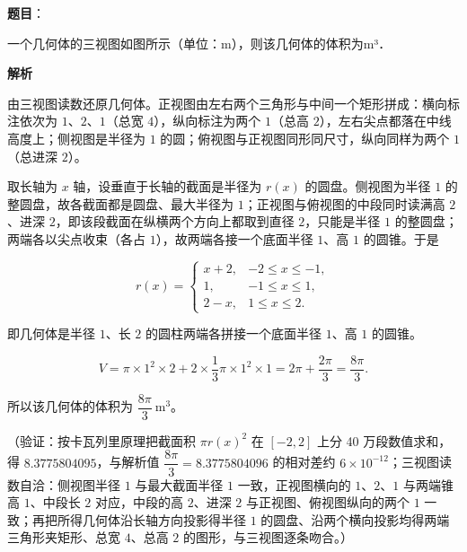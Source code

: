 \begin{answer}

\textbf{题目}：

一个几何体的三视图如图所示（单位：m），则该几何体的体积为\gkblank{}m³．
\nopagebreak[4]
\begin{center}\end{center}
\nopagebreak[4]
\textbf{解析}

由三视图读数还原几何体。正视图由左右两个三角形与中间一个矩形拼成：横向标注依次为 \(1\)、\(2\)、\(1\)（总宽 \(4\)），纵向标注为两个 \(1\)（总高 \(2\)），左右尖点都落在中线高度上；侧视图是半径为 \(1\) 的圆；俯视图与正视图同形同尺寸，纵向同样为两个 \(1\)（总进深 \(2\)）。

取长轴为 \(x\) 轴，设垂直于长轴的截面是半径为 \(r(x)\) 的圆盘。侧视图为半径 \(1\) 的整圆盘，故各截面都是圆盘、最大半径为 \(1\)；正视图与俯视图的中段同时读满高 \(2\)、进深 \(2\)，即该段截面在纵横两个方向上都取到直径 \(2\)，只能是半径 \(1\) 的整圆盘；两端各以尖点收束（各占 \(1\)），故两端各接一个底面半径 \(1\)、高 \(1\) 的圆锥。于是

\nopagebreak[4]
\[
r(x)=\begin{cases}x+2,&-2\leqslant x\leqslant-1,\\1,&-1\leqslant x\leqslant1,\\2-x,&1\leqslant x\leqslant2.\end{cases}
\]

即几何体是半径 \(1\)、长 \(2\) 的圆柱两端各拼接一个底面半径 \(1\)、高 \(1\) 的圆锥。

\nopagebreak[4]
\[
V=\pi\times1^2\times2+2\times\dfrac13\pi\times1^2\times1=2\pi+\dfrac{2\pi}3=\dfrac{8\pi}3.
\]

所以该几何体的体积为 \(\dfrac{8\pi}{3}\ \mathrm{m}^3\)。

（验证：按卡瓦列里原理把截面积 \(\pi r(x)^2\) 在 \(\left[-2,2\right]\) 上分 40 万段数值求和，得 \(8.3775804095\)，与解析值 \(\dfrac{8\pi}{3}=8.3775804096\) 的相对差约 \(6\times10^{-12}\)；三视图读数自洽：侧视图半径 \(1\) 与最大截面半径 \(1\) 一致，正视图横向的 \(1\)、\(2\)、\(1\) 与两端锥高 \(1\)、中段长 \(2\) 对应，中段的高 \(2\)、进深 \(2\) 与正视图、俯视图纵向的两个 \(1\) 一致；再把所得几何体沿长轴方向投影得半径 \(1\) 的圆盘、沿两个横向投影均得两端三角形夹矩形、总宽 \(4\)、总高 \(2\) 的图形，与三视图逐条吻合。）


\end{answer}

